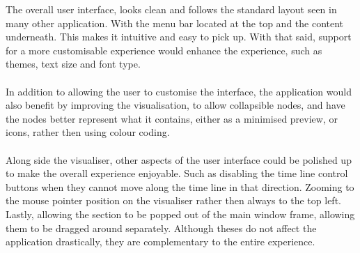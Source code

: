 The overall user interface, looks clean and follows the standard layout seen in many other application. With the menu bar located at the top and the content underneath. This makes it intuitive and easy to pick up. With that said, support for a more customisable experience would enhance the experience, such as themes, text size and font type.
\\\\
In addition to allowing the user to customise the interface, the application would also benefit by improving the visualisation, to allow collapsible nodes, and have the nodes better represent what it contains, either as a minimised preview, or icons, rather then using colour coding.
\\\\
Along side the visualiser, other aspects of the user interface could be polished up to make the overall experience enjoyable. Such as disabling the time line control buttons when they cannot move along the time line in that direction. Zooming to the mouse pointer position on the visualiser rather then always to the top left. Lastly, allowing the section to be popped out of the main window frame, allowing them to be dragged around separately. Although theses do not affect the application drastically, they are complementary to the entire experience.

